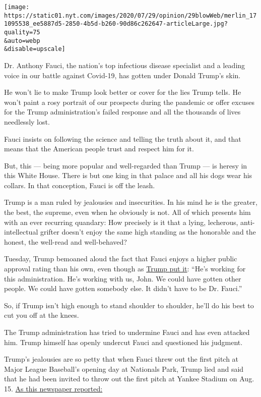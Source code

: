 \texttt{[image: https://static01.nyt.com/images/2020/07/29/opinion/29blowWeb/merlin\_171095538\_ee5887d5-2850-4b5d-b260-90d86c262647-articleLarge.jpg?quality=75\\\&auto=webp\\\&disable=upscale]}

Dr. Anthony Fauci, the nation's top infectious disease specialist and a
leading voice in our battle against Covid-19, has gotten under Donald
Trump's skin.

He won't lie to make Trump look better or cover for the lies Trump
tells. He won't paint a rosy portrait of our prospects during the
pandemic or offer excuses for the Trump administration's failed response
and all the thousands of lives needlessly lost.

Fauci insists on following the science and telling the truth about it,
and that means that the American people trust and respect him for it.

But, this --- being more popular and well-regarded than Trump --- is
heresy in this White House. There is but one king in that palace and all
his dogs wear his collars. In that conception, Fauci is off the leash.

Trump is a man ruled by jealousies and insecurities. In his mind he is
the greater, the best, the supreme, even when he obviously is not. All
of which presents him with an ever recurring quandary: How precisely is
it that a lying, lecherous, anti-intellectual grifter doesn't enjoy the
same high standing as the honorable and the honest, the well-read and
well-behaved?

Tuesday, Trump bemoaned aloud the fact that Fauci enjoys a higher public
approval rating than his own, even though as
\href{https://www.whitehouse.gov/briefings-statements/remarks-president-trump-press-briefing-july-28-2020/}{Trump
put it}: ``He's working for this administration. He's working with us,
John. We could have gotten other people. We could have gotten somebody
else. It didn't have to be Dr. Fauci.''

So, if Trump isn't high enough to stand shoulder to shoulder, he'll do
his best to cut you off at the knees.

The Trump administration has tried to undermine Fauci and has even
attacked him. Trump himself has openly undercut Fauci and questioned his
judgment.

Trump's jealousies are so petty that when Fauci threw out the first
pitch at Major League Baseball's opening day at Nationals Park, Trump
lied and said that he had been invited to throw out the first pitch at
Yankee Stadium on Aug. 15.
\href{https://www.nytimes.com/2020/07/27/us/politics/trump-yankees-fauci.html}{As
this newspaper reported:}

